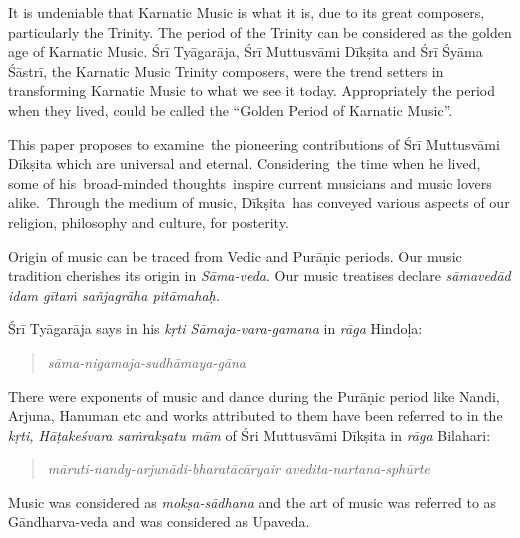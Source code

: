 It is undeniable that Karnatic Music is what it is, due to its great composers, particularly the Trinity. The period of the Trinity can be considered as the golden age of Karnatic Music. Śrī Tyāgarāja, Śrī Muttusvāmi Dīkṣita and Śrī Śyāma Śāstrī, the Karnatic Music Trinity composers, were the trend setters in transforming Karnatic Music to what we see it today. Appropriately the period when they lived, could be called the “Golden Period of Karnatic Music”. 

This paper proposes to examine the pioneering contributions of Śrī Muttusvāmi Dīkṣita which are universal and eternal. Considering the time when he lived, some of his broad-minded thoughts inspire current musicians and music lovers alike.~Through the medium of music, Dīkṣita has conveyed various aspects of our religion, philosophy and culture, for posterity. 

Origin of music can be traced from Vedic and Purāṇic periods. Our music tradition cherishes its origin in \textit{Sāma-veda}. Our music treatises declare \textit{sāmavedād idam gītaṁ sañjagrāha pitāmahaḥ.}

Śrī Tyāgarāja says in his \textit{kṛti Sāmaja-vara-gamana} in \textit{rāga} Hindoḷa:

\begin{verse}
\qquad\textit{sāma-nigamaja-sudhāmaya-gāna}
\end{verse}

There were exponents of music and dance during the Purāṇic period like Nandi, Arjuna, Hanuman etc and works attributed to them have been referred to in the \textit{kṛti, Hāṭakeśvara saṁrakṣatu mām} of Śri Muttusvāmi Dīkṣita in \textit{rāga} Bilahari:

\begin{verse}
\textit{māruti-nandy-arjunādi-bharatācāryair avedita-nartana-sphūrte}
\end{verse}

\vspace{-.2cm}

Music was considered as \textit{mokṣa-sādhana} and the art of music was referred to as Gāndharva-veda and was considered as Upaveda.


